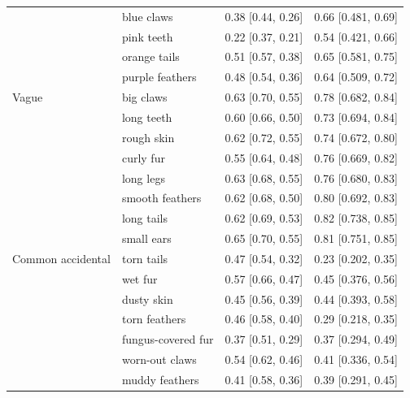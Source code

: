 \documentclass[12pt,letterpaper]{article}
\begin{document}
\begin{table}[h]
\begin{tabular}{| l || l | l | l |}
                  & blue claws         & 0.38 {[}0.44, 0.26{]}   & 0.66 {[}0.481, 0.69{]}       \\
                  & pink teeth         & 0.22 {[}0.37, 0.21{]}   & 0.54 {[}0.421, 0.66{]}       \\
                  & orange tails       & 0.51 {[}0.57, 0.38{]}   & 0.65 {[}0.581, 0.75{]}       \\
                  & purple feathers    & 0.48 {[}0.54, 0.36{]}   & 0.64 {[}0.509, 0.72{]}       \\
Vague             & big claws          & 0.63 {[}0.70, 0.55{]}   & 0.78 {[}0.682, 0.84{]}       \\
                  & long teeth         & 0.60 {[}0.66, 0.50{]}   & 0.73 {[}0.694, 0.84{]}       \\
                  & rough skin         & 0.62 {[}0.72, 0.55{]}   & 0.74 {[}0.672, 0.80{]}       \\
                  & curly fur          & 0.55 {[}0.64, 0.48{]}   & 0.76 {[}0.669, 0.82{]}       \\
                  & long legs          & 0.63 {[}0.68, 0.55{]}   & 0.76 {[}0.680, 0.83{]}       \\
                  & smooth feathers    & 0.62 {[}0.68, 0.50{]}   & 0.80 {[}0.692, 0.83{]}       \\
                  & long tails         & 0.62 {[}0.69, 0.53{]}   & 0.82 {[}0.738, 0.85{]}       \\
                  & small ears         & 0.65 {[}0.70, 0.55{]}   & 0.81 {[}0.751, 0.85{]}       \\
Common accidental & torn tails         & 0.47 {[}0.54, 0.32{]}   & 0.23 {[}0.202, 0.35{]}       \\
                  & wet fur            & 0.57 {[}0.66, 0.47{]}   & 0.45 {[}0.376, 0.56{]}       \\
                  & dusty skin         & 0.45 {[}0.56, 0.39{]}   & 0.44 {[}0.393, 0.58{]}       \\
                  & torn feathers      & 0.46 {[}0.58, 0.40{]}   & 0.29 {[}0.218, 0.35{]}       \\
                  & fungus-covered fur & 0.37 {[}0.51, 0.29{]}   & 0.37 {[}0.294, 0.49{]}       \\
                  & worn-out claws     & 0.54 {[}0.62, 0.46{]}   & 0.41 {[}0.336, 0.54{]}       \\
                  & muddy feathers     & 0.41 {[}0.58, 0.36{]}   & 0.39 {[}0.291, 0.45{]}       \\

\end{tabular}
\end{table}
\end{document}

